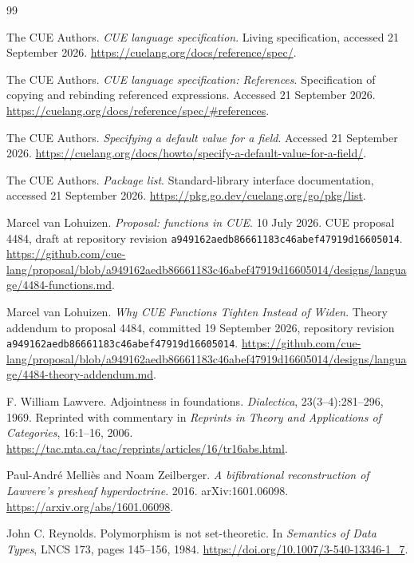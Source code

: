 \documentclass[11pt,a4paper,oneside]{report}
\theoremstyle{remark}
\begin{document}
\clearpage
\renewcommand{\bibname}{References}
\begin{thebibliography}{99}
\raggedright

The CUE Authors.
\emph{CUE language specification}.
Living specification, accessed 21 September 2026.
\url{https://cuelang.org/docs/reference/spec/}.

The CUE Authors.
\emph{CUE language specification: References}.
Specification of copying and rebinding referenced expressions.
Accessed 21 September 2026.
\url{https://cuelang.org/docs/reference/spec/#references}.

The CUE Authors.
\emph{Specifying a default value for a field}.
Accessed 21 September 2026.
\url{https://cuelang.org/docs/howto/specify-a-default-value-for-a-field/}.

The CUE Authors.
\emph{Package list}.
Standard-library interface documentation, accessed 21 September 2026.
\url{https://pkg.go.dev/cuelang.org/go/pkg/list}.

Marcel van Lohuizen.
\emph{Proposal: functions in CUE}. 10 July 2026.
CUE proposal 4484, draft at repository revision
\texttt{a949162aedb86661183c46abef47919d16605014}.
\url{https://github.com/cue-lang/proposal/blob/a949162aedb86661183c46abef47919d16605014/designs/language/4484-functions.md}.

Marcel van Lohuizen.
\emph{Why CUE Functions Tighten Instead of Widen}.
Theory addendum to proposal 4484, committed 19 September 2026,
repository revision \texttt{a949162aedb86661183c46abef47919d16605014}.
\url{https://github.com/cue-lang/proposal/blob/a949162aedb86661183c46abef47919d16605014/designs/language/4484-theory-addendum.md}.

F. William Lawvere.
Adjointness in foundations.
\emph{Dialectica}, 23(3--4):281--296, 1969.
Reprinted with commentary in \emph{Reprints in Theory and Applications of
Categories}, 16:1--16, 2006.
\url{https://tac.mta.ca/tac/reprints/articles/16/tr16abs.html}.

Paul-Andr\'e Melli\`es and Noam Zeilberger.
\emph{A bifibrational reconstruction of Lawvere's presheaf hyperdoctrine}.
2016. arXiv:1601.06098.
\url{https://arxiv.org/abs/1601.06098}.

John C. Reynolds.
Polymorphism is not set-theoretic.
In \emph{Semantics of Data Types}, LNCS 173, pages 145--156, 1984.
\url{https://doi.org/10.1007/3-540-13346-1_7}.


\end{thebibliography}
\end{document}
